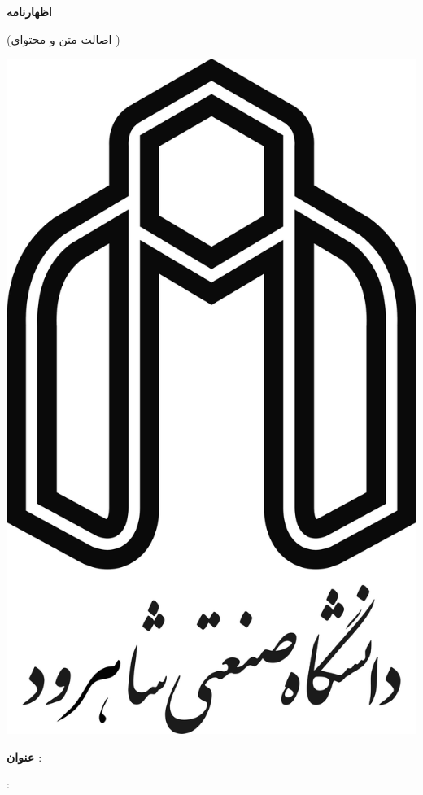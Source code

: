 
{\parindent0pt

\begin{center}
{\large\bf اظهارنامه}

{\small(اصالت متن و محتوای \ThesisType{} \ThesisDegree)}
\end{center}
\vspace{-6em}
\includegraphics[scale=0.08]{front/template/images/logo.png}
\vspace{1em}

\textbf{عنوان ‌\ThesisType}: \ThesisTitle

\vspace{.1em}
\begin{multicols}{2}
	{: \ThesisSupervisor}
	

\end{multicols}}
